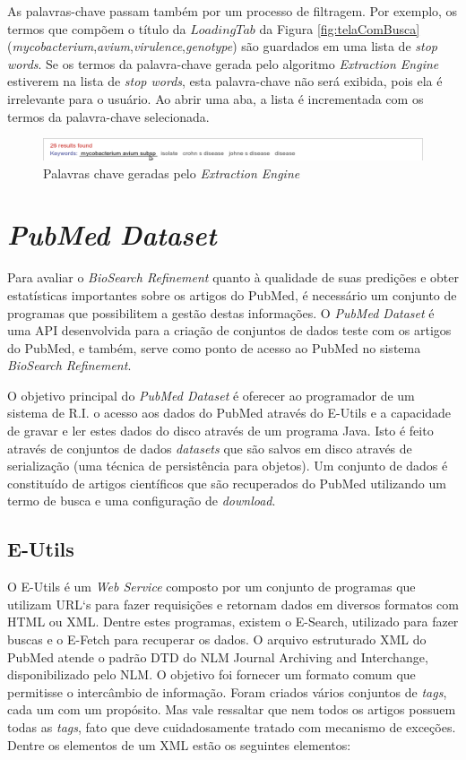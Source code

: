 As palavras-chave passam também por um processo de filtragem. Por exemplo, os termos que compõem o título da $LoadingTab$ da Figura \ref{fig:telaComBusca} (\emph{mycobacterium},\emph{avium},\emph{virulence},\emph{genotype}) são guardados em uma lista de \emph{stop words}. Se os termos da palavra-chave gerada pelo algoritmo \emph{Extraction Engine} estiverem na lista de \emph{stop words}, esta palavra-chave não será exibida, pois ela é irrelevante para o usuário. Ao abrir uma aba, a lista é incrementada com os termos da palavra-chave selecionada.

\begin{figure}[h!]
    \center
    \includegraphics[scale=0.4]{imagens/palavrasChave.png}
    \caption{Palavras chave geradas pelo \emph{Extraction Engine} \label{fig:palavrasChave}} 
\end{figure}

\section{\emph{PubMed Dataset}}

Para avaliar o \emph{BioSearch Refinement} quanto à qualidade de suas predições e obter estatísticas importantes sobre os artigos do PubMed, é necessário um conjunto de programas que possibilitem a gestão destas informações. O \emph{PubMed Dataset} é uma API desenvolvida para a criação de conjuntos de dados teste com os artigos do PubMed, e também, serve como ponto de acesso ao PubMed no sistema \emph{BioSearch Refinement}. 

O objetivo principal do \emph{PubMed Dataset} é oferecer ao programador de um sistema de R.I. o acesso aos dados do PubMed através do E-Utils \cite{Eutils2010} e a capacidade de gravar e ler estes dados do disco através de um programa Java. Isto é feito através de conjuntos de dados \emph{datasets} que são salvos em disco através de serialização (uma técnica de persistência para objetos). Um conjunto de dados é constituído de artigos científicos que são recuperados do PubMed utilizando um termo de busca e uma configuração de \emph{download}.

\subsection{E-Utils}
O E-Utils é um \emph{Web Service} composto por um conjunto de programas que utilizam URL`s para fazer requisições e retornam dados em diversos formatos com HTML ou XML. Dentre estes programas, existem o E-Search, utilizado para fazer buscas e o E-Fetch para recuperar os dados. O arquivo estruturado XML do PubMed atende o padrão DTD do NLM Journal Archiving and Interchange, disponibilizado pelo NLM. O objetivo foi fornecer um formato comum que permitisse o intercâmbio de informação. Foram criados vários conjuntos de \emph{tags}, cada um com um propósito. Mas vale ressaltar que nem todos os artigos possuem todas as \emph{tags}, fato que deve cuidadosamente tratado com mecanismo de exceções. Dentre os elementos de um XML estão os seguintes elementos:

